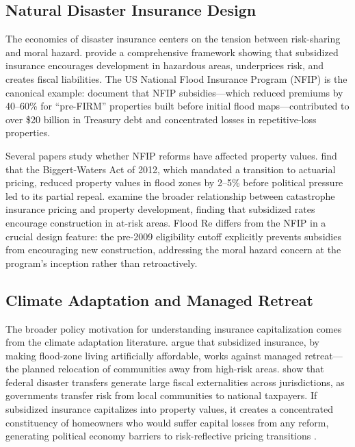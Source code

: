 \documentclass[12pt]{article}
\begin{document}
\subsection{Natural Disaster Insurance Design}

The economics of disaster insurance centers on the tension between risk-sharing and moral hazard. \citet{kunreuther2015risk} provide a comprehensive framework showing that subsidized insurance encourages development in hazardous areas, underprices risk, and creates fiscal liabilities. The US National Flood Insurance Program (NFIP) is the canonical example: \citet{kousky2017examining} document that NFIP subsidies---which reduced premiums by 40--60\% for ``pre-FIRM'' properties built before initial flood maps---contributed to over \$20 billion in Treasury debt and concentrated losses in repetitive-loss properties.

Several papers study whether NFIP reforms have affected property values. \citet{bin2008changes} find that the Biggert-Waters Act of 2012, which mandated a transition to actuarial pricing, reduced property values in flood zones by 2--5\% before political pressure led to its partial repeal. \citet{browne2000effect} examine the broader relationship between catastrophe insurance pricing and property development, finding that subsidized rates encourage construction in at-risk areas. Flood Re differs from the NFIP in a crucial design feature: the pre-2009 eligibility cutoff explicitly prevents subsidies from encouraging new construction, addressing the moral hazard concern at the program's inception rather than retroactively.

\subsection{Climate Adaptation and Managed Retreat}

The broader policy motivation for understanding insurance capitalization comes from the climate adaptation literature. \citet{depietri2022flood} argue that subsidized insurance, by making flood-zone living artificially affordable, works against managed retreat---the planned relocation of communities away from high-risk areas. \citet{deryugina2017fiscal} show that federal disaster transfers generate large fiscal externalities across jurisdictions, as governments transfer risk from local communities to national taxpayers. If subsidized insurance capitalizes into property values, it creates a concentrated constituency of homeowners who would suffer capital losses from any reform, generating political economy barriers to risk-reflective pricing transitions \citep{hsiang2017estimating}.
\end{document}
